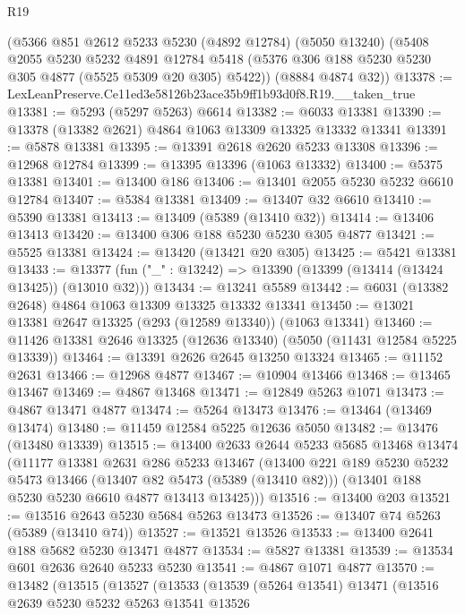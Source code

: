 \begin{lexlean}{R19}
\begin{coremodule}
    (@5366
      @851
      @2612
      @5233
      @5230
      (@4892 @12784)
      (@5050 @13240)
      (@5408
        @2055
        @5230
        @5232
        @4891
        @12784
        @5418
        (@5376 @306 @188 @5230 @5230 @305 @4877 (@5525 @5309 @20 @305) @5422))
      (@8884 @4874 @32))
@13378 := LexLeanPreserve.Ce11ed3e58126b23ace35b9ff1b93d0f8.R19.__taken_true
@13381 := @5293 (@5297 @5263) @6614
@13382 := @6033 @13381
@13390 := @13378 (@13382 @2621) @4864 @1063 @13309 @13325 @13332 @13341
@13391 := @5878 @13381
@13395 := @13391 @2618 @2620 @5233 @13308
@13396 := @12968 @12784
@13399 := @13395 @13396 (@1063 @13332)
@13400 := @5375 @13381
@13401 := @13400 @186
@13406 := @13401 @2055 @5230 @5232 @6610 @12784
@13407 := @5384 @13381
@13409 := @13407 @32 @6610
@13410 := @5390 @13381
@13413 := @13409 (@5389 (@13410 @32))
@13414 := @13406 @13413
@13420 := @13400 @306 @188 @5230 @5230 @305 @4877
@13421 := @5525 @13381
@13424 := @13420 (@13421 @20 @305)
@13425 := @5421 @13381
@13433 := @13377 (fun ("_" : @13242) => @13390 (@13399 (@13414 (@13424 @13425)) (@13010 @32)))
@13434 := @13241 @5589
@13442 := @6031 (@13382 @2648) @4864 @1063 @13309 @13325 @13332 @13341
@13450 := @13021 @13381 @2647 @13325 (@293 (@12589 @13340)) (@1063 @13341)
@13460 := @11426 @13381 @2646 @13325 (@12636 @13340) (@5050 (@11431 @12584 @5225 @13339))
@13464 := @13391 @2626 @2645 @13250 @13324
@13465 := @11152 @2631
@13466 := @12968 @4877
@13467 := @10904 @13466
@13468 := @13465 @13467
@13469 := @4867 @13468
@13471 := @12849 @5263 @1071
@13473 := @4867 @13471 @4877
@13474 := @5264 @13473
@13476 := @13464 (@13469 @13474)
@13480 := @11459 @12584 @5225 @12636 @5050
@13482 := @13476 (@13480 @13339)
@13515 := @13400
    @2633
    @2644
    @5233
    @5685
    @13468
    @13474
    (@11177
      @13381
      @2631
      @286
      @5233
      @13467
      (@13400
        @221
        @189
        @5230
        @5232
        @5473
        @13466
        (@13407 @82 @5473 (@5389 (@13410 @82)))
        (@13401 @188 @5230 @5230 @6610 @4877 @13413 @13425)))
@13516 := @13400 @203
@13521 := @13516 @2643 @5230 @5684 @5263 @13473
@13526 := @13407 @74 @5263 (@5389 (@13410 @74))
@13527 := @13521 @13526
@13533 := @13400 @2641 @188 @5682 @5230 @13471 @4877
@13534 := @5827 @13381
@13539 := @13534 @601 @2636 @2640 @5233 @5230
@13541 := @4867 @1071 @4877
@13570 := @13482
    (@13515
      (@13527
        (@13533
          (@13539
            (@5264 @13541)
            @13471
            (@13516
              @2639
              @5230
              @5232
              @5263
              @13541
              @13526

\end{coremodule}
\end{lexlean}
